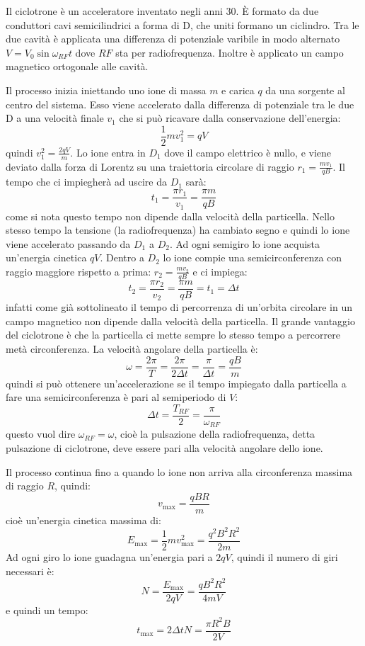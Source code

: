 \begin{Es}[Ciclotrone]
  Il ciclotrone  è un acceleratore inventato negli anni 30. È formato da due conduttori cavi semicilindrici a forma di D, che uniti formano un ciclindro. Tra le due cavità è applicata una differenza di potenziale varibile in modo alternato $V=V_0\sin\omega_{RF}t$ dove $RF$ sta per radiofrequenza. Inoltre è applicato un campo magnetico ortogonale alle cavità.

  Il processo inizia iniettando uno ione di massa $m$ e carica $q$ da una sorgente al centro del sistema. Esso viene accelerato dalla differenza di potenziale tra le due D a una velocità finale $v_1$ che si può ricavare dalla conservazione dell'energia:
  \[
    \frac{1}{2}mv_1^2 = qV
  \]
  quindi $v_1^2 = \frac{2qV}{m}$. Lo ione entra in $D_1$ dove il campo elettrico è nullo, e viene deviato dalla forza di Lorentz su una traiettoria circolare di raggio $r_1=\frac{m v_1}{qB}$. Il tempo che ci impiegherà ad uscire da $D_1$ sarà:
  \[
    t_1 = \frac{\pi r_1}{v_1}=\frac{\pi m}{qB}
  \]
  come si nota questo tempo non dipende dalla velocità della particella. Nello stesso tempo la tensione (la radiofrequenza) ha cambiato segno e quindi lo ione viene accelerato passando da $D_1$ a $D_2$. Ad ogni semigiro lo ione acquista un'energia cinetica $qV$. Dentro a $D_2$ lo ione compie una semicirconferenza con raggio maggiore rispetto a prima: $r_2=\frac{m v_2}{qB}$ e ci impiega:
  \[
    t_2 = \frac{\pi r_2}{v_2}=\frac{\pi m}{qB} = t_1 = \Delta t
  \]
  infatti come già sottolineato il tempo di percorrenza di un'orbita circolare in un campo magnetico non dipende dalla velocità della particella. Il grande vantaggio del ciclotrone è che la particella ci mette sempre lo stesso tempo a percorrere metà circonferenza. La velocità angolare della particella è:
  \[
    \omega = \frac{2\pi}{T} = \frac{2\pi}{2\Delta t} = \frac{\pi}{\Delta t} = \frac{qB}{m}
  \]
  quindi si può ottenere un'accelerazione se il tempo impiegato dalla particella a fare una semicirconferenza è pari al semiperiodo di $V$:
  \[
    \Delta t = \frac{T_{RF}}{2} = \frac{\pi}{\omega_{RF}}
  \]
  questo vuol dire $\omega_{RF}=\omega$, cioè la pulsazione della radiofrequenza, detta pulsazione di ciclotrone, deve essere pari alla velocità angolare dello ione.

  Il processo continua fino a quando lo ione non arriva alla circonferenza massima di raggio $R$, quindi:
  \[
    v_{\max} = \frac{qBR}{m}
  \]
  cioè un'energia cinetica massima di:
  \[
    E_{\max} = \frac{1}{2}mv_{\max}^2 = \frac{q^2 B^2 R^2}{2m}
  \]
  Ad ogni giro lo ione guadagna un'energia pari a $2qV$, quindi il numero di giri necessari è:
  \[
    N = \frac{E_{\max}}{2qV} = \frac{qB^2R^2}{4mV}
  \]
  e quindi un tempo:
  \[
    t_{\max} = 2\Delta tN = \frac{\pi R^2 B}{2V}
  \]


\end{Es}
